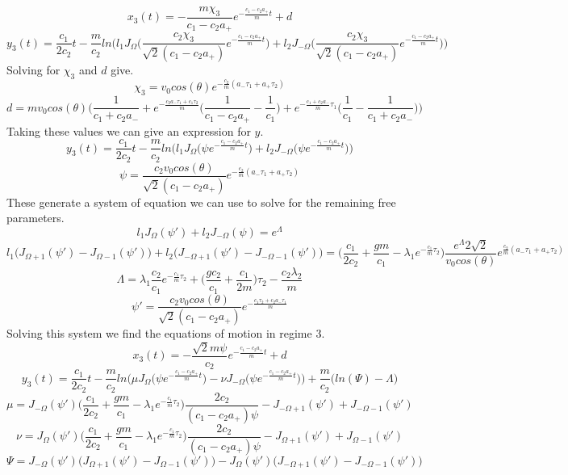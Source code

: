 \documentclass{article}
\begin{document}
$$
x_{3}(t) = -\frac{m\chi_{3}}{c_{1}-c_{2}a_{+}}e^{-\frac{c_{1}-c_{2}a_{+}}{m}t}+d
$$
$$
y_{3}(t)=\frac{c_{1}}{2 c_{2}}t-\frac{m}{c_{2}}ln\bigg(l_{1}J_{\Omega}\bigg( \frac{c_{2}\chi_{3}}{\sqrt{2}(c_{1}-c_{2}a_{+})} e^{-\frac{c_{1}-c_{2}a_{+}}{m}t} \bigg)+l_{2}J_{-\Omega}\bigg( \frac{c_{2}\chi_{3}}{\sqrt{2}(c_{1}-c_{2}a_{+})} e^{-\frac{c_{1}-c_{2}a_{+}}{m}t} \bigg)\bigg)
$$
Solving for $\chi_{3}$ and $d$ give. 
$$
\chi_{3} = v_{0}cos(\theta)e^{-\frac{c_{2}}{m}(a_{-}\tau_{1}+a_{+}\tau_{2})}
$$
$$
d = mv_{0}cos(\theta) \bigg(\frac{1}{c_{1}+c_{2}a_{-}} + e^{-\frac{c_{2}a_{-}\tau_{1}+c_{1}\tau_{2}}{m}}\bigg( \frac{1}{c_{1}-c_{2}a_{+}}-\frac{1}{c_{1}} \bigg)+e^{-\frac{c_{1}+c_{2}a_{-}}{m}\tau_{1}}\bigg(\frac{1}{c_{1}}-\frac{1}{c_{1}+c_{2}a_{-}}\bigg) \bigg)
$$
Taking these values we can give an expression for $y$.
$$
y_{3}(t)=\frac{c_{1}}{2 c_{2}}t-\frac{m}{c_{2}}ln\bigg(l_{1}J_{\Omega}\bigg( \psi e^{-\frac{c_{1}-c_{2}a_{+}}{m}t} \bigg)+l_{2}J_{-\Omega}\bigg( \psi e^{-\frac{c_{1}-c_{2}a_{+}}{m}t} \bigg)\bigg)
$$
$$
\psi = \frac{c_{2}v_{0}cos(\theta)}{\sqrt{2}(c_{1}-c_{2}a_{+})}e^{-\frac{c_{2}}{m}(a_{-}\tau_{1}+a_{+}\tau_{2})}
$$
These generate a system of equation we can use to solve for the remaining free parameters.
$$
l_{1}J_{\Omega}(\psi')+l_{2}J_{-\Omega}(\psi) = e^{\Lambda}
$$
$$
l_{1}\bigg( J_{\Omega+1}(\psi')-J_{\Omega-1}(\psi') \bigg)+l_{2}\bigg( J_{-\Omega+1}(\psi')-J_{-\Omega-1}(\psi') \bigg) = \bigg( \frac{c_{1}}{2c_{2}}+\frac{gm}{c_{1}}-\lambda_{1} e^{-\frac{c_{1}}{m}\tau_{2}} \bigg) \frac{e^{\Lambda} 2\sqrt{2}}{v_{0}cos(\theta)}e^{\frac{c_{2}}{m}(a_{-}\tau_{1}+a_{+}\tau_{2})}
$$
$$
\Lambda =  \lambda_{1}\frac{c_{2}}{c_{1}}e^{-\frac{c_{1}}{m}\tau_{2}}+\bigg( \frac{gc_{2}}{c_{1}} + \frac{c_{1}}{2m}\bigg)\tau_{2}-\frac{c_{2}\lambda_{2}}{m}
$$
$$
\psi' = \frac{c_{2}v_{0}cos(\theta)}{\sqrt{2}(c_{1}-c_{2}a_{+})}e^{-\frac{c_{1}\tau_{2}+c_{2}a_{-}\tau_{1}}{m}}
$$
Solving this system we find the equations of motion in regime 3.
$$
x_{3}(t) = -\frac{\sqrt{2}m\psi}{c_{2}}e^{-\frac{c_{1}-c_{2}a_{+}}{m}t} + d
$$
$$
y_{3}(t) = \frac{c_{1}}{2 c_{2}}t-\frac{m}{c_{2}}ln \bigg(\mu J_{\Omega}\bigg( \psi e^{-\frac{c_{1}-c_{2}a_{+}}{m}t} \bigg) - \nu J_{-\Omega}\bigg( \psi e^{-\frac{c_{1}-c_{2}a_{+}}{m}t} \bigg) \bigg) + \frac{m}{c_{2}}\bigg(ln ( \Psi ) - \Lambda \bigg)
$$
$$
\mu = J_{-\Omega}(\psi')\bigg( \frac{c_{1}}{2c_{2}}+\frac{gm}{c_{1}}-\lambda_{1}e^{-\frac{c_{1}}{m}\tau_{2}} \bigg)\frac{2c_{2}}{(c_{1}-c_{2}a_{+})\psi}-J_{-\Omega+1}(\psi')+J_{-\Omega-1}(\psi')
$$
$$
\nu = J_{\Omega}(\psi')\bigg( \frac{c_{1}}{2c_{2}}+\frac{gm}{c_{1}}-\lambda_{1}e^{-\frac{c_{1}}{m}\tau_{2}} \bigg)\frac{2c_{2}}{(c_{1}-c_{2}a_{+})\psi}-J_{\Omega+1}(\psi')+J_{\Omega-1}(\psi')
$$
$$
\Psi = J_{-\Omega}(\psi') \bigg( J_{\Omega+1}(\psi')-J_{\Omega-1}(\psi') \bigg) -J_{\Omega}(\psi') \bigg( J_{-\Omega+1}(\psi')-J_{-\Omega-1}(\psi') \bigg)
$$
\end{document}
